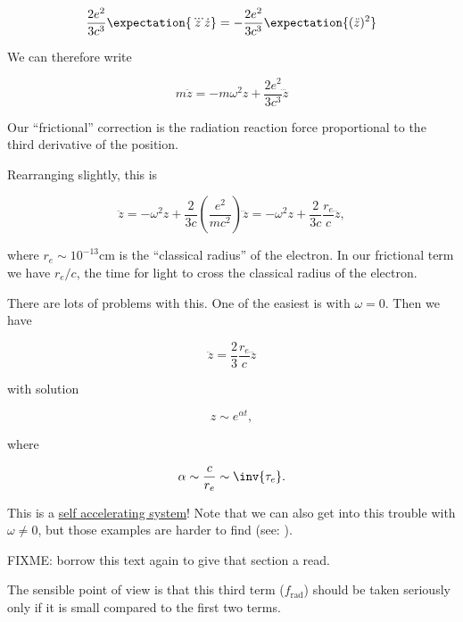 \begin{equation}\label{eqn:relativisticElectrodynamicsL26:350}
\frac{2 e^2}{3 c^3} \expectation{ \dddot{z} \dot{z} } =
-\frac{2 e^2}{3 c^3} \expectation{ (\ddot{z})^2 }
\end{equation}

We can therefore write

\begin{equation}\label{eqn:relativisticElectrodynamicsL26:370}
m \ddot{z} = -m \omega^2 z + \frac{2 e^2}{3 c^3} \dddot{z}
\end{equation}

Our ``frictional'' correction is the radiation reaction force proportional to the third derivative of the position.

Rearranging slightly, this is

\begin{equation}\label{eqn:relativisticElectrodynamicsL26:390}
\ddot{z} = - \omega^2 z + \frac{2}{3 c} \left( \frac{e^2}{m c^2} \right) \dddot{z}
 = - \omega^2 z + \frac{2}{3 c} \frac{r_e}{c} \dddot{z},
\end{equation}

where $r_e \sim 10^{-13} \text{cm}$ is the ``classical radius'' of the electron.  In our frictional term we have $r_e/c$, the time for light to cross the classical radius of the electron.

There are lots of problems with this.  One of the easiest is with $\omega = 0$.  Then we have

\begin{equation}\label{eqn:relativisticElectrodynamicsL26:410}
\ddot{z} = \frac{2}{3} \frac{r_e}{c} \dddot{z}
\end{equation}

with solution 

\begin{equation}\label{eqn:relativisticElectrodynamicsL26:430}
z \sim e^{\alpha t},
\end{equation}

where

\begin{equation}\label{eqn:relativisticElectrodynamicsL26:450}
\alpha \sim \frac{c}{r_e} \sim \inv{\tau_e}.
\end{equation}

This is a \underline{self accelerating system}!  Note that we can also get into this trouble with $\omega \ne 0$, but those examples are harder to find (see: \cite{griffith1981introduction}).

FIXME: borrow this text again to give that section a read.

The sensible point of view is that this third term ($f_{\text{rad}}$) should be taken seriously only if it is small compared to the first two terms.

%

\EndArticle
